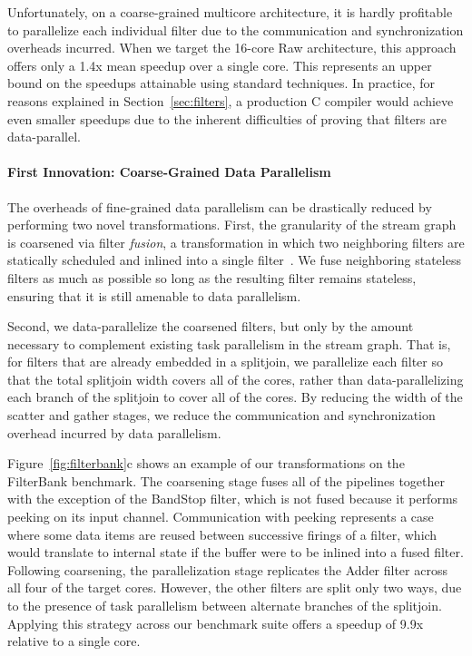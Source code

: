 Unfortunately, on a coarse-grained multicore architecture, it is
hardly profitable to parallelize each individual filter due to the
communication and synchronization overheads incurred.  When we target
the 16-core Raw architecture, this approach offers only a 1.4x mean
speedup over a single core.  This represents an upper bound on the
speedups attainable using standard techniques.  In practice, for
reasons explained in Section~\ref{sec:filters}, a production C
compiler would achieve even smaller speedups due to the inherent
difficulties of proving that filters are data-parallel.

\paragraph*{First Innovation: Coarse-Grained Data Parallelism}  The
overheads of fine-grained data parallelism can be drastically reduced
by performing two novel transformations.  First, the granularity of
the stream graph is coarsened via filter {\it fusion}, a
transformation in which two neighboring filters are statically
scheduled and inlined into a single
filter~\cite{streamit-asplos,sermulins:lctes:2005}.  We fuse
neighboring stateless filters as much as possible so long as the
resulting filter remains stateless, ensuring that it is still amenable
to data parallelism.

Second, we data-parallelize the coarsened filters, but only by the
amount necessary to complement existing task parallelism in the stream
graph.  That is, for filters that are already embedded in a splitjoin,
we parallelize each filter so that the total splitjoin width covers
all of the cores, rather than data-parallelizing each branch of the
splitjoin to cover all of the cores.  By reducing the width of the
scatter and gather stages, we reduce the communication and
synchronization overhead incurred by data parallelism.

Figure~\ref{fig:filterbank}c shows an example of our
transformations on the FilterBank benchmark.  The coarsening stage
fuses all of the pipelines together with the exception of the BandStop
filter, which is not fused because it performs peeking on its input
channel.  Communication with peeking represents a case where some data
items are reused between successive firings of a filter, which would
translate to internal state if the buffer were to be inlined into a
fused filter.  Following coarsening, the parallelization stage
replicates the Adder filter across all four of the target cores.
However, the other filters are split only two ways, due to the
presence of task parallelism between alternate branches of the
splitjoin.  Applying this strategy across our benchmark suite offers a
speedup of 9.9x relative to a single core.

